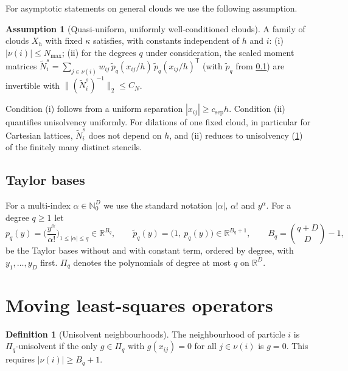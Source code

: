 \documentclass[11pt,a4paper]{article}
\theoremstyle{plain}
\theoremstyle{definition}
\newtheorem{definition}[theorem]{Definition}
\newtheorem{assumption}[theorem]{Assumption}
\theoremstyle{remark}
\numberwithin{equation}{section}
\newcommand{\R}{\mathbb{R}}
\newcommand{\N}{\mathbb{N}}
\newcommand{\nb}{\nu}
\newcommand{\ptil}{\tilde p}
\newcommand{\Ntil}{\tilde N}
\begin{document}
For asymptotic statements on general clouds we use the following assumption.

\begin{assumption}[Quasi-uniform, uniformly well-conditioned clouds]\label{ass:cloud}
A family of clouds $X_h$ with fixed $\kappa$ satisfies, with constants independent of $h$ and $i$: (i) $|\nb(i)|\le N_{\max}$; (ii) for the degrees $q$ under consideration, the scaled moment matrices $\Ntil^{s}_i=\sum_{j\in\nb(i)}w_{ij}\,\ptil_q(x_{ij}/h)\,\ptil_q(x_{ij}/h)^{\mathsf T}$ (with $\ptil_q$ from \cref{sec:taylor}) are invertible with $\|(\Ntil^{s}_i)^{-1}\|_2\le C_N$.
\end{assumption}

Condition (i) follows from a uniform separation $|x_{ij}|\ge c_{\mathrm{sep}}h$. Condition (ii) quantifies unisolvency uniformly. For dilations of one fixed cloud, in particular for Cartesian lattices, $\Ntil^s_i$ does not depend on $h$, and (ii) reduces to unisolvency (\cref{def:unisolvent}) of the finitely many distinct stencils.

\subsection{Taylor bases}\label{sec:taylor}

For a multi-index $\alpha\in\N_0^D$ we use the standard notation $|\alpha|$, $\alpha!$ and $y^\alpha$. For a degree $q\ge1$ let
\begin{equation}
p_q(y) = \Big(\frac{y^\alpha}{\alpha!}\Big)_{1\le|\alpha|\le q}\in\R^{B_q},\qquad
\ptil_q(y) = \big(1,\ p_q(y)\big)\in\R^{B_q+1},\qquad
B_q = \binom{q+D}{D}-1,
\end{equation}
be the Taylor bases without and with constant term, ordered by degree, with $y_1,\dots,y_D$ first. $\Pi_q$ denotes the polynomials of degree at most $q$ on $\R^D$.

\section{Moving least-squares operators}\label{sec:mls}

\begin{definition}[Unisolvent neighbourhoods]\label{def:unisolvent}
The neighbourhood of particle $i$ is $\Pi_q$-unisolvent if the only $g\in\Pi_q$ with $g(x_{ij})=0$ for all $j\in\nb(i)$ is $g=0$. This requires $|\nb(i)|\ge B_q+1$.
\end{definition}
\end{document}
